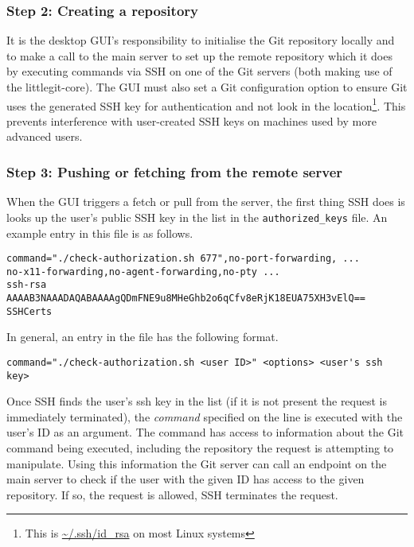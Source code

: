 \subsubsection{Step 2: Creating a repository}
 
It is the desktop GUI's responsibility to initialise the Git repository locally and to make a call to the main server to set up the remote repository which it does by executing commands via SSH on one of the Git servers (both making use of the littlegit-core). The GUI must also set a Git configuration option to ensure Git uses the generated SSH key for authentication and not look in the location\footnote{This is \url{~/.ssh/id_rsa} on most Linux systems}. This prevents interference with user-created SSH keys on machines used by more advanced users.

\subsubsection{Step 3: Pushing or fetching from the remote server}

When the GUI triggers a fetch or pull from the server, the first thing SSH does is looks up the user's public SSH key in the list in the \texttt{authorized\_keys} file. An example entry in this file is as follows.

\begin{verbatim}
command="./check-authorization.sh 677",no-port-forwarding, ...
no-x11-forwarding,no-agent-forwarding,no-pty ...
ssh-rsa AAAAB3NAAADAQABAAAAgQDmFNE9u8MHeGhb2o6qCfv8eRjK18EUA75XH3vElQ== SSHCerts
\end{verbatim}

In general, an entry in the file has the following format.

\begin{verbatim}
command="./check-authorization.sh <user ID>" <options> <user's ssh key>
\end{verbatim}

Once SSH finds the user's ssh key in the list (if it is not present the request is immediately terminated), the \emph{command} specified on the line is executed with the user's ID as an argument. The command has access to information about the Git command being executed, including the repository the request is attempting to manipulate. Using this information the Git server can call an endpoint on the main server to check if the user with the given ID has access to the given repository. If so, the request is allowed, SSH terminates the request.


